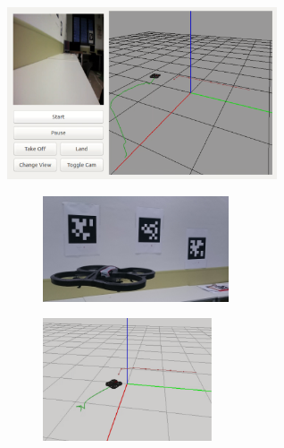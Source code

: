 \documentclass[notes,slidesec,a4]{seminar}
\begin{document}
\begin{hslide}

\begin{center}
	\begin{figure}
		\centering
		\includegraphics[width=8cm]{img/realderiva}
	\end{figure}
\end{center}

\end{hslide}

\begin{hslide}

\begin{center}
	\begin{figure}
		\centering
		\begin{subfigure}
			\centering
			\includegraphics[width=5.5cm]{img/dronevueloreal}
		\end{subfigure}%
		\begin{subfigure}
			\centering
			\includegraphics[width=5cm]{img/appcapture}
		\end{subfigure}
	\end{figure}
\end{center}

\end{hslide}
\end{document}
